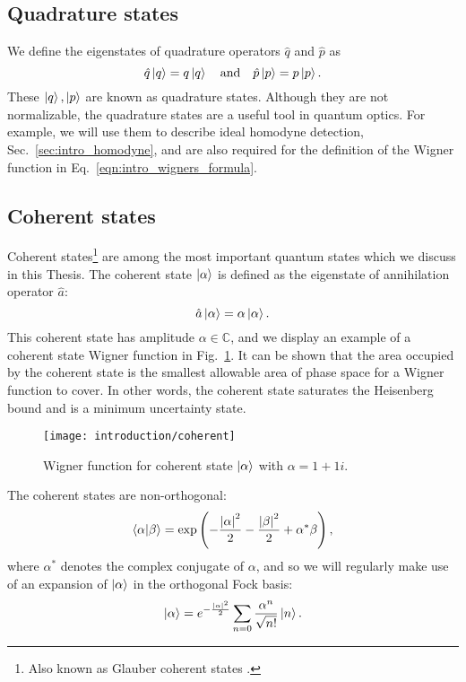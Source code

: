 \subsection{Quadrature states}
We define the eigenstates of quadrature operators $\hat{q}$ and $\hat{p}$ as
\begin{equation}\label{eqn:intro_quadrature_state}
\hat{q}\ket{q} = q \ket{q} \qq{and} \hat{p}\ket{p} = p \ket{p}.
\end{equation}
These $\ket{q}, \ket{p}$ are known as quadrature states. Although they are not normalizable, the quadrature states are a useful tool in quantum optics. For example, we will use them to describe ideal homodyne detection, Sec.~\ref{sec:intro_homodyne}, and are also required for the definition of the Wigner function in Eq.~\ref{eqn:intro_wigners_formula}.


\FloatBarrier
\subsection{Coherent states}
Coherent states\footnote{Also known as Glauber coherent states \cite{Glauber1963}.} are among the most important quantum states which we discuss in this Thesis. The coherent state $\ket{\alpha}$ is defined as the eigenstate of annihilation operator $\hat{a}$:
\begin{equation}
\hat{a}\ket{\alpha} = \alpha \ket{\alpha}.
\end{equation}
This coherent state has amplitude $\alpha \in \mathbb{C}$, and we display an example of a coherent state Wigner function in Fig.~\ref{fig:intro_coherent_wigner}. It can be shown that the area occupied by the coherent state is the smallest allowable area of phase space for a Wigner function to cover. In other words, the coherent state saturates the Heisenberg bound and is a minimum uncertainty state.%

\begin{figure}[htp]
\centering
\captionsetup{width=0.8\linewidth}
\texttt{[image: introduction/coherent]}
\caption{\label{fig:intro_coherent_wigner} Wigner function for coherent state $\ket{\alpha}$ with $\alpha = 1 + 1i$.}
\end{figure}

\noindent The coherent states are non-orthogonal:
\begin{equation}
\ip{\alpha}{\beta} = \exp\left(- \frac{\left|\alpha\right|^2}{2} - \frac{\left|\beta\right|^2}{2} + \alpha^* \beta \right),
\end{equation}
where $\alpha^*$ denotes the complex conjugate of $\alpha$, and so we will regularly make use of an expansion of $\ket{\alpha}$ in the orthogonal Fock basis:
\begin{equation}\label{eqn:intro_coherent_fock}
\ket{\alpha} = e^{-\frac{\left|\alpha\right|^2}{2}} \sum_{n=0} \frac{\alpha^n}{\sqrt{n!}} \ket{n}.
\end{equation}

